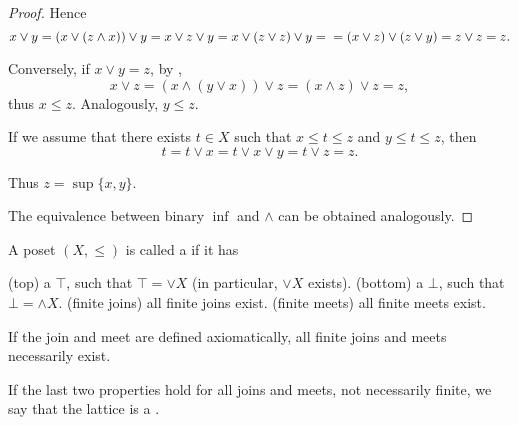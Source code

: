 \begin{proof}
  Hence
  \begin{equation*}
    x \vee y = (x \vee (z \wedge x)) \vee y = x \vee z \vee y = x \vee (z \vee z) \vee y = \\ = (x \vee z) \vee (z \vee y) = z \vee z = z.
  \end{equation*}

  Conversely, if \( x \vee y = z \), by ,
  \begin{equation*}
    x \vee z = (x \wedge (y \vee x)) \vee z = (x \wedge z) \vee z = z,
  \end{equation*}
  thus \( x \leq z \). Analogously, \( y \leq z \).

  If we assume that there exists \( t \in X \) such that \( x \leq t \leq z \) and \( y \leq t \leq z \), then
  \begin{equation*}
    t = t \vee x = t \vee x \vee y = t \vee z = z.
  \end{equation*}

  Thus \( z = \sup \{ x, y \} \).

  The equivalence between binary \( \inf \) and \( \wedge \) can be obtained analogously.
\end{proof}

\begin{definition}\label{def:lattice}
  A poset \( (X, \leq) \) is called a  if it has
  \begin{defenum}
    (top) a  \( \top \), such that \( \top = \vee X \) (in particular, \( \vee X \) exists).
    (bottom) a  \( \bot \), such that \( \bot = \wedge X \).
    (finite joins) all finite joins exist.
    (finite meets) all finite meets exist.
  \end{defenum}

  If the join and meet are defined axiomatically, all finite joins and meets necessarily exist.

  If the last two properties hold for all joins and meets, not necessarily finite, we say that the lattice is a .
\end{definition}

